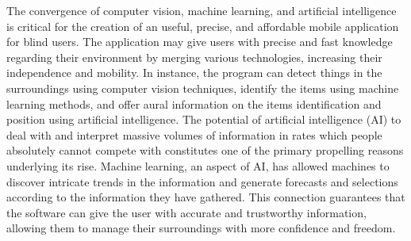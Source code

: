 \documentclass[MScCS]{uccthesis}
\begin{document}
The convergence of computer vision, machine learning, and artificial intelligence is critical for the creation of an useful, precise, and affordable mobile application for blind users. The application may give users with precise and fast knowledge regarding their environment by merging various technologies, increasing their independence and mobility. In instance, the program can detect things in the surroundings using computer vision techniques, identify the items using machine learning methods, and offer aural information on the items identification and position using artificial intelligence. The potential of artificial intelligence (AI) to deal with and interpret massive volumes of information in rates which people absolutely cannot compete with constitutes one of the primary propelling reasons underlying its rise. Machine learning, an aspect of AI, has allowed machines to discover intricate trends in the information and generate forecasts and selections according to the information they have gathered. This connection guarantees that the software can give the user with accurate and trustworthy information, allowing them to manage their surroundings with more confidence and freedom.
\end{document}
